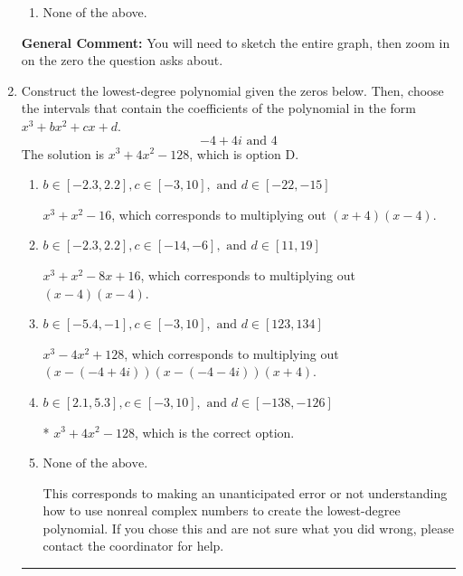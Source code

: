 \documentclass{extbook}[14pt]
\newcommand{\litem}[1]{\item #1

\rule{\textwidth}{0.4pt}}
\begin{document}
\begin{enumerate}
{\begin{enumerate}[label=\Alph*.]
\item None of the above.\end{enumerate}
\textbf{General Comment:} You will need to sketch the entire graph, then zoom in on the zero the question asks about.
}
\litem{
Construct the lowest-degree polynomial given the zeros below. Then, choose the intervals that contain the coefficients of the polynomial in the form $x^3+bx^2+cx+d$.
\[ -4 + 4 i \text{ and } 4 \]
The solution is \( x^{3} +4 x^{2} -128 \), which is option D.\begin{enumerate}[label=\Alph*.]
\item \( b \in [-2.3, 2.2], c \in [-3, 10], \text{ and } d \in [-22, -15] \)

$x^{3} + x^{2} -16$, which corresponds to multiplying out $(x + 4)(x -4)$.
\item \( b \in [-2.3, 2.2], c \in [-14, -6], \text{ and } d \in [11, 19] \)

$x^{3} + x^{2} -8 x + 16$, which corresponds to multiplying out $(x -4)(x -4)$.
\item \( b \in [-5.4, -1], c \in [-3, 10], \text{ and } d \in [123, 134] \)

$x^{3} -4 x^{2} + 128$, which corresponds to multiplying out $(x-(-4 + 4 i))(x-(-4 - 4 i))(x + 4)$.
\item \( b \in [2.1, 5.3], c \in [-3, 10], \text{ and } d \in [-138, -126] \)

* $x^{3} +4 x^{2} -128$, which is the correct option.
\item \( \text{None of the above.} \)

This corresponds to making an unanticipated error or not understanding how to use nonreal complex numbers to create the lowest-degree polynomial. If you chose this and are not sure what you did wrong, please contact the coordinator for help.
\end{enumerate}

}
\end{enumerate}
\end{document}
